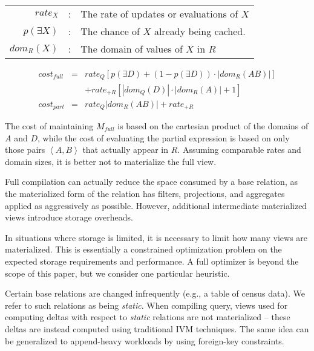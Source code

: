 \vspace*{0.07in}
{\small
\begin{tabular}{rcl}
$rate_X$ & : & The rate of updates or evaluations of $X$\\
$p(\exists X)$ & : & The chance of $X$ already being cached.\\
$dom_R(X)$ & : & The domain of values of $X$ in $R$\\
\end{tabular}
\vspace*{-0.09in}
\begin{eqnarray*}
cost_{full} & = & rate_{Q} \left[p(\exists D) + (1-p(\exists D))\cdot|dom_R(AB)|\right] \\
 &  & + rate_{+R} \left[|dom_Q(D)|\cdot|dom_R(A)| + 1\right]\\
cost_{part} & = & rate_{Q} |dom_R(AB)| + rate_{+R}
\end{eqnarray*}
}
The cost of maintaining $M_{full}$ is based on the cartesian product of the domains of $A$ and $D$, while the cost of evaluating the partial expression is based on only those pairs $\left<A,B\right>$ that actually appear in $R$.  Assuming comparable rates and domain sizes, it is better not to materialize the full view.

Full compilation can actually reduce the space consumed by a base relation, as the materialized form of the relation has filters, projections, and aggregates applied as aggressively as possible.  However, additional intermediate materialized views introduce storage overheads.

In situations where storage is limited, it is necessary to limit how many views are materialized.  This is essentially a constrained optimization problem on the expected storage requirements and performance.  A full optimizer is beyond the scope of this paper, but we consider one particular heuristic.

Certain base relations are changed infrequently (e.g., a table of census data).  We refer to such relations as being {\em static}.  When compiling query, views used for computing deltas with respect to {\em static} relations are not materialized -- these deltas are instead computed using traditional IVM techniques.   The same idea can be generalized to append-heavy workloads by using foreign-key constraints.